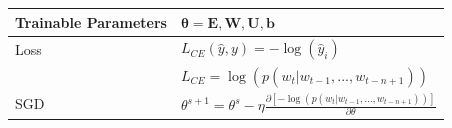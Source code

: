 \begin{table}[H]
    \begin{tabular}{|l|l|}
        \hline
         Trainable Parameters & \(\mathbf{\theta = E,W,U,b}\) \\
         \hline
         Loss & \( L_{CE}(\hat{y}, y) = -\log(\hat{y}_i) \) \\
         & \( L_{CE} = \log(p(w_t|w_{t-1},...,w_{t-n+1})) \) \\
         \hline
         SGD & \begin{minipage}{8cm}
             \vspace{0.2cm}
             \( \theta^{s+1} = \theta^s - \eta\displaystyle\frac{\partial[-\log(p(w_t|w_{t-1},...,w_{t-n+1}))]}{\partial\theta} \)
             \vspace{0.2cm}
         \end{minipage}\\
         \hline
    \end{tabular}
\end{table}
































